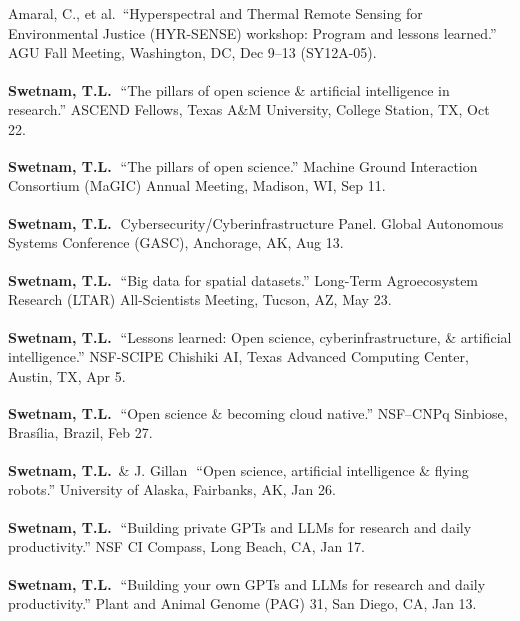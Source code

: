 \documentclass[11pt,letterpaper]{article}
\newcommand{\me}{\textbf{Swetnam, T.L.}}
\newcommand{\inv}{\textsuperscript{\color{cherry}\,\ding{72}}}
\newcommand{\yearhead}[1]{\par\vspace{5pt}{\small\bfseries\color{cherry}#1}\par\vspace{2pt}}
\newenvironment{hanglist}
  {\begin{list}{}{\setlength{\leftmargin}{1.4em}\setlength{\itemindent}{-1.4em}%
     \setlength{\itemsep}{3pt}\setlength{\parsep}{0pt}\setlength{\topsep}{1pt}}}
  {\end{list}}
\begin{document}
\yearhead{2024}
\begin{hanglist}
\item Amaral, C., et al.\ ``Hyperspectral and Thermal Remote Sensing for Environmental Justice (HYR-SENSE) workshop: Program and lessons learned.'' AGU Fall Meeting, Washington, DC, Dec 9--13 (SY12A-05).
\item \me\inv\ ``The pillars of open science \& artificial intelligence in research.'' ASCEND Fellows, Texas A\&M University, College Station, TX, Oct 22.
\item \me\inv\ ``The pillars of open science.'' Machine Ground Interaction Consortium (MaGIC) Annual Meeting, Madison, WI, Sep 11.
\item \me\inv\ Cybersecurity/Cyberinfrastructure Panel. Global Autonomous Systems Conference (GASC), Anchorage, AK, Aug 13.
\item \me\inv\ ``Big data for spatial datasets.'' Long-Term Agroecosystem Research (LTAR) All-Scientists Meeting, Tucson, AZ, May 23.
\item \me\inv\ ``Lessons learned: Open science, cyberinfrastructure, \& artificial intelligence.'' NSF-SCIPE Chishiki AI, Texas Advanced Computing Center, Austin, TX, Apr 5.
\item \me\inv\ ``Open science \& becoming cloud native.'' NSF--CNPq Sinbiose, Bras\'ilia, Brazil, Feb 27.
\item \me\ \& J. Gillan\inv\ ``Open science, artificial intelligence \& flying robots.'' University of Alaska, Fairbanks, AK, Jan 26.
\item \me\inv\ ``Building private GPTs and LLMs for research and daily productivity.'' NSF CI Compass, Long Beach, CA, Jan 17.
\item \me\inv\ ``Building your own GPTs and LLMs for research and daily productivity.'' Plant and Animal Genome (PAG) 31, San Diego, CA, Jan 13.
\end{hanglist}
\end{document}
